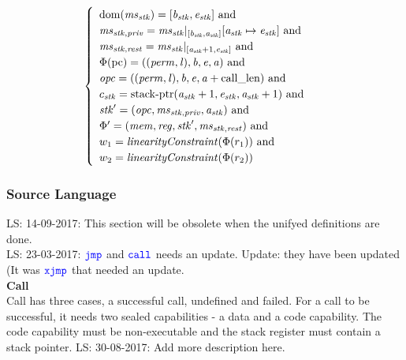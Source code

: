 \documentclass[a4paper]{article}
\newcommand\lau[1]{{\color{purple} \sf \footnotesize {LS: #1}}\\}
\newcommand{\dom}{\mathrm{dom}}
\newcommand{\tand}{\text{ and }}
\newcommand{\sourcecolor}{\color{blue}}
\newcommand{\src}[1]{{\sourcecolor #1}}
\newcommand{\zinstr}[1]{\texttt{#1}}
\newcommand{\oneinstr}[2]{
  \ifthenelse{\equal{#2}{}}
  {\zinstr{#1}}
  {\zinstr{#1} \; #2}
}
\newcommand{\twoinstr}[3]{
  \ifthenelse{\equal{#2#3}{}}
  {\zinstr{#1}}
  {\zinstr{#1} \; #2 \; #3}
}
\newcommand{\sjmp}[1]{\oneinstr{\src{jmp}}{#1}}
\newcommand{\scall}[2]{\twoinstr{\src{call}}{#1}{#2}}
\newcommand{\sxjmp}[2]{\twoinstr{\src{xjmp}}{#1}{#2}}
\newcommand{\update}[2]{[#1 \mapsto #2]}
\newcommand{\perm}{\var{perm}}
\newcommand{\lin}{\var{l}}
\newcommand{\stkptr}[1]{\mathrm{stack\text{-}ptr}(#1)}
\newcommand{\var}[1]{\mathit{#1}}
\newcommand{\reg}{\var{reg}}
\newcommand{\mem}{\var{mem}}
\newcommand{\ms}{\var{ms}}
\newcommand{\stk}{\var{stk}}
\newcommand{\priv}{\var{priv}}
\newcommand{\opc}{\var{opc}}
\newcommand{\baddr}{\var{b}}
\newcommand{\eaddr}{\var{e}}
\newcommand{\aaddr}{\var{a}}
\newcommand{\constant}[1]{\mathrm{#1}}
\newcommand{\calllen}{\constant{call\_len}}
\newcommand{\pcreg}{\mathrm{pc}}
\newcommand{\plainfun}[2]{
  \ifthenelse{\equal{#2}{}}
  {\mathit{#1}}
  {\mathit{#1}(#2)}
}
\newcommand{\linCons}[1]{\plainfun{linearityConstraint}{#1}}
\begin{document}
\begin{align*}
\begin{cases}
\begin{array}[t]{l}
                                                   \dom(\ms_\stk) = [\baddr_\stk,\eaddr_\stk] \tand\\
                                                   \ms_{\stk,\priv} = \ms_\stk |_{[\baddr_\stk,\aaddr_\stk]}\update{\aaddr_\stk}{\eaddr_\stk} \tand\\
                                                   \ms_{\stk,\var{rest}} = \ms_\stk|_{[\aaddr_\stk + 1,\eaddr_\stk]} \tand\\
                                                   \Phi(\pcreg) = ((\perm,\lin),\baddr,\eaddr,\aaddr) \tand \\
                                                   \opc = ((\perm,\lin),\baddr,\eaddr,\aaddr+\calllen) \tand \\
                                                   c_\stk = \stkptr{\aaddr_\stk+1,\eaddr_\stk,\aaddr_\stk+1} \tand \\
                                                   \stk' = (\opc,\ms_{\stk,\priv},\aaddr_\stk)\tand\\
                                                   \Phi' = (\mem,\reg,\stk',\ms_{\stk,\var{rest}})\tand\\
                                                   w_1 = \linCons{\Phi(r_1)} \tand \\
                                                   w_2 = \linCons{\Phi(r_2)}
                                                 \end{array}
                                               \end{cases}
\end{align*}





\subsubsection{Source Language}
\label{sec:source-language}
\lau{14-09-2017: This section will be obsolete when the unifyed definitions are done.}
\lau{23-03-2017: $\sjmp{}$ and $\scall{}{}$ needs an update. Update: they have been updated (It was $\sxjmp{}{}$ that needed an update.}

\textbf{Call}\\
Call has three cases, a successful call, undefined and failed. For a call to be successful, it needs two sealed capabilities - a data and a code capability. The code capability must be non-executable and the stack register must contain a stack pointer.
\lau{30-08-2017: Add more description here.}
\end{document}
